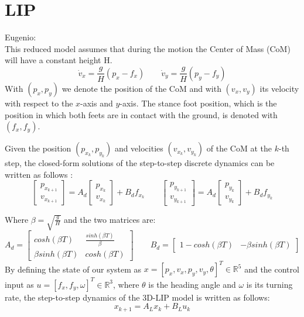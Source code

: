 \documentclass[main.tex]{subfiles}
\begin{document}
\section{LIP}\label{sec:lip_eugenio}
Eugenio:\\
This reduced model assumes that during the motion the Center of Mass (CoM) will have a constant height H.
\begin{equation}
    \dot{v}_{x} = \frac{g}{H}(p_{x} - f_{x})
    \qquad
    \dot{v}_{y} = \frac{g}{H}(p_{y} - f_{y})
\end{equation}
With $(p_{x}, p_{y})$ we denote the position of the CoM and with $(v_{x}, v_{y})$ its velocity with respect to the $x$-axis and $y$-axis. The stance foot position, which is the position in which both feets are in contact with the ground, is denoted with $(f_{x}, f_{y})$.

Given the position $(p_{x_{k}}, p_{y_{k}})$ and velocities $(v_{x_{k}}, v_{y_{k}})$ of the CoM at the $k$-th step, the closed-form solutions of the step-to-step discrete dynamics can be written as follows :
\begin{equation}
    \begin{bmatrix}
        p_{x_{k+1}} \\
        v_{x_{k+1}}
    \end{bmatrix}
    = A_{d}
    \begin{bmatrix}
        p_{x_{k}} \\
        v_{x_{k}}
    \end{bmatrix}
    + B_{d} f_{x_{k}}
    \qquad
    \begin{bmatrix}
        p_{y_{k+1}} \\
        v_{y_{k+1}}
    \end{bmatrix}
    = A_{d}
    \begin{bmatrix}
        p_{y_{k}} \\
        v_{y_{k}}
    \end{bmatrix}
    + B_{d} f_{y_{k}}
\end{equation}

Where $\beta = \sqrt{\frac{g}{H}}$ and the two matrices are:
\begin{equation}
    A_{d} = 
    \begin{bmatrix}
        cosh(\beta T) & \frac{sinh(\beta T)}{\beta} \\
        \beta sinh(\beta T) & cosh(\beta T)
    \end{bmatrix}
    \qquad
    B_{d} = 
    \begin{bmatrix}
        1 - cosh(\beta T) & - \beta sinh(\beta T)
    \end{bmatrix}
\end{equation}
By defining the state of our system as $x = [p_{x}, v_{x}, p_{y}, v_{y}, \theta]^T \in \mathbb{R}^5$ and the control input as $u = [f_{x}, f_{y}, \omega]^T \in \mathbb{R}^3$, where $\theta$ is the heading angle and $\omega$ is its turning rate, the step-to-step dynamics of the 3D-LIP model is written as follows:
\begin{equation}
    x_{k+1} = A_{L}x_{k} + B_{L}u_{k}
\end{equation}
\end{document}
